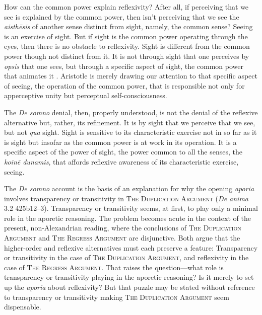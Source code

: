 
How can the common power explain reflexivity? After all, if perceiving that we see is explained by the common power, then isn't perceiving that we see the \emph{aisthēsis} of another sense distinct from sight, namely, the common sense?  Seeing is an exercise of sight. But if sight is the common power operating through the eyes, then there is no obstacle to reflexivity. Sight is different from the common power though not distinct from it. It is not through sight that one perceives by \emph{opsis} that one sees, but through a specific aspect of sight, the common power that animates it \citep[779]{caston02}. Aristotle is merely drawing our attention to that specific aspect of seeing, the operation of the common power, that is responsible not only for apperceptive unity but perceptual self-consciousness. 


The \emph{De somno} denial, then, properly understood, is not the denial of the reflexive alternative but, rather, its refinement. It is by sight that we perceive that we see, but not \emph{qua} sight. Sight is sensitive to its characteristic exercise not in so far as it is sight but insofar as the common power is at work in its operation. It is a specific aspect of the power of sight, the power common to all the senses, the \emph{koinē dunamis}, that affords reflexive awareness of its characteristic exercise, seeing.

The \emph{De somno} account is the basis of an explanation for why the opening \emph{aporia} involves transparency or transitivity in \textsc{The Duplication Argument} (\emph{De anima} 3.2 425b12–3). Transparency or transitivity seems, at first, to play only a minimal role in the aporetic reasoning. The problem becomes acute in the context of the present, non-Alexandrian reading, where the conclusions of \textsc{The Duplication Argument} and \textsc{The Regress Argument} are disjunctive. Both argue that the higher-order and reflexive alternatives must each preserve a feature: Transparency or transitivity in the case of \textsc{The Duplication Argument}, and reflexivity in the case of \textsc{The Regress Argument}. That raises the question—what role is transparency or transitivity playing in the aporetic reasoning? Is it merely to set up the \emph{aporia} about reflexivity? But that puzzle may be stated without reference to transparency or transitivity making \textsc{The Duplication Argument} seem dispensable.

